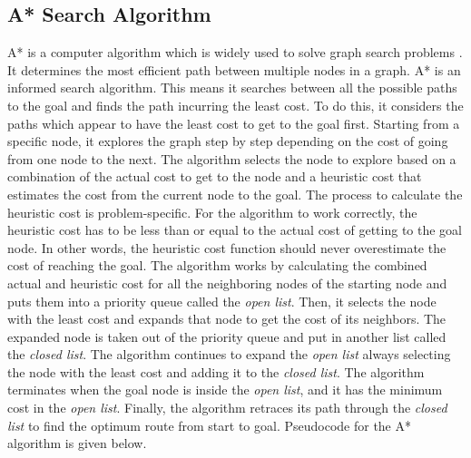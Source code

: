 
\subsection{A* Search Algorithm}
A* is a computer algorithm which is widely used to solve graph search problems \cite{a8book}. It determines the most efficient path between multiple nodes in a graph. A* is an informed search algorithm. This means it searches between all the possible paths to the goal and finds the path incurring the least cost. To do this, it considers the paths which appear to have the least cost to get to the goal first. Starting from a specific node, it explores the graph step by step depending on the cost of going from one node to the next. The algorithm selects the node to explore based on a combination of the actual cost to get to the node and a heuristic cost that estimates the cost from the current node to the goal. The process to calculate the heuristic cost is problem-specific. For the algorithm to work correctly, the heuristic cost has to be less than or equal to the actual cost of getting to the goal node. In other words, the heuristic cost function should never overestimate the cost of reaching the goal. The algorithm works by calculating the combined actual and heuristic cost for all the neighboring nodes of the starting node and puts them into a priority queue called the \textit{open list}. Then, it selects the node with the least cost and expands that node to get the cost of its neighbors. The expanded node is taken out of the priority queue and put in another list called the \textit{closed list}. The algorithm continues to expand the \textit{open list} always selecting the node with the least cost and adding it to the \textit{closed list}. The algorithm terminates when the goal node is inside the \textit{open list}, and it has the minimum cost in the \textit{open list}. Finally, the algorithm retraces its path through the \textit{closed list} to find the optimum route from start to goal. Pseudocode for the A* algorithm is given below.


